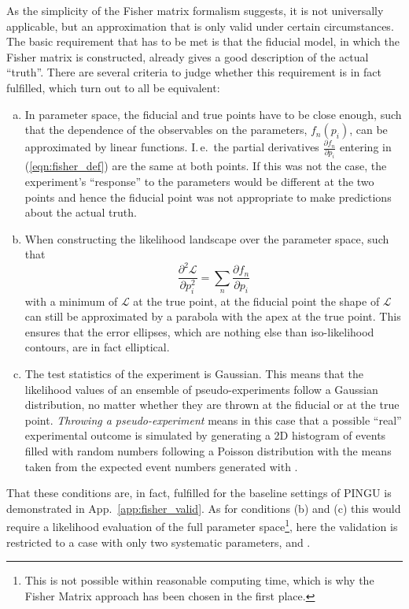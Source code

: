 As the simplicity of the Fisher matrix formalism suggests, it is not
universally applicable, but an approximation that is only valid under certain
circumstances. The basic requirement that has to be met is that the fiducial
model, in which the Fisher matrix is constructed, already gives a good
description of the actual ``truth''. There are several criteria to judge
whether this requirement is in fact fulfilled, which turn out to all be
equivalent:
\begin{enumerate}[(a)]
 \item In parameter space, the fiducial and true points have to be close
  enough, such that the dependence of the observables on the parameters,
  $f_n(p_i)$, can be approximated by linear functions. I.\,e.\ the partial
  derivatives $\frac{\partial f_n}{\partial p_i}$ entering in
  (\ref{eqn:fisher_def}) are the same at both points. If this was not the case,
  the experiment's ``response'' to the parameters would be different at the two
  points and hence the fiducial point was not appropriate to make predictions
  about the actual truth.
 \item When constructing the likelihood landscape over the parameter space, such
  that
  \begin{equation}
   \frac{\partial^2\mathcal{L}}{\partial p_i^2}
     = \sum_n \frac{\partial f_n}{\partial p_i}
   \label{eqn:fisher_llh}
  \end{equation}
  with a minimum of $\mathcal{L}$ at the true point, at the fiducial point the
  shape of $\mathcal{L}$ can still be approximated by a parabola with the apex
  at the true point. This ensures that the error ellipses, which are nothing
  else than iso-likelihood contours, are in fact elliptical.
 \item The test statistics of the experiment is Gaussian. This means that the
  likelihood values of an ensemble of pseudo-experiments follow a Gaussian
  distribution, no matter whether they are thrown at the fiducial or at the true
  point. \emph{Throwing a pseudo-experiment} means in this case that
  a possible ``real'' experimental outcome is simulated by generating a 2D
  histogram of events filled with random numbers following a Poisson
  distribution with the means taken from the expected event numbers generated
  with \papa.
\end{enumerate}
That these conditions are, in fact, fulfilled for the baseline settings of
PINGU is demonstrated in App.~\ref{app:fisher_valid}. As for conditions (b)
and (c) this would require a likelihood evaluation of the full parameter
space\footnote{This is not possible within reasonable computing time, which is
why the Fisher Matrix approach has been chosen in the first place.}, here the
validation is restricted to a case with only two systematic parameters, 
and .

